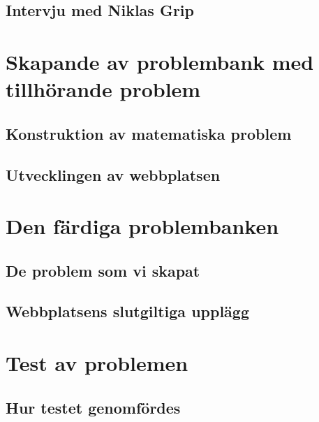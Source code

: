 \documentclass[11pt,a4paper]{article}
\begin{document}
    
    \subsection{Intervju med Niklas Grip}
    
    \label{sec:intervju}
    
\section{Skapande av problembank med tillhörande problem}
    \subsection{Konstruktion av matematiska problem}
    \label{sec:Skapandetavproblem}
        

    \subsection{Utvecklingen av webbplatsen}
        
        
\section{Den färdiga problembanken}
        
    
    \subsection{De problem som vi skapat}
        
    
    \subsection{Webbplatsens slutgiltiga upplägg}
        
    
\section{Test av problemen}
    
    \subsection{Hur testet genomfördes}
        
        
\end{document}
